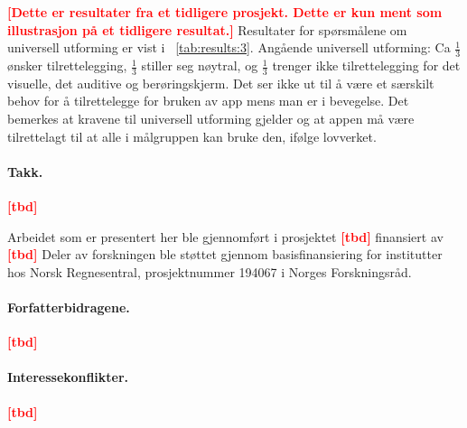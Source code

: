 \documentclass[11pt,english]{nik}
\newcommand{\WVL}[1]{\textbf{\textcolor{red}{#1}}}
\begin{document}
\WVL{[Dette er resultater fra et tidligere prosjekt. Dette er kun ment som illustrasjon på et tidligere resultat.]}
Resultater for spørsmålene om universell utforming er vist i \tablename~\ref{tab:results:3}.
Angående universell utforming: Ca $\frac13$ ønsker tilrettelegging,
$\frac13$ stiller seg nøytral, og $\frac13$ trenger ikke
tilrettelegging for det visuelle, det auditive og berøringskjerm. Det ser
ikke ut til å være et særskilt behov for å tilrettelegge for bruken av
app mens man er i bevegelse. Det bemerkes at kravene til universell
utforming gjelder og at appen må være tilrettelagt til at alle i
målgruppen kan bruke den, ifølge lovverket. 


%
%
%



\paragraph{Takk.}
\WVL{[tbd]}

Arbeidet som er presentert her ble gjennomført i prosjektet
\WVL{[tbd]} finansiert av
\WVL{[tbd]}
%
Deler av forskningen ble støttet gjennom basisfinansiering for
institutter hos Norsk Regnesentral, prosjektnummer 194067 i Norges
Forskningsråd.


\paragraph{Forfatterbidragene.}
\WVL{[tbd]}

\paragraph{Interessekonflikter.}
\WVL{[tbd]}

%
%
%
%
\printbibliography

%
\end{document}
